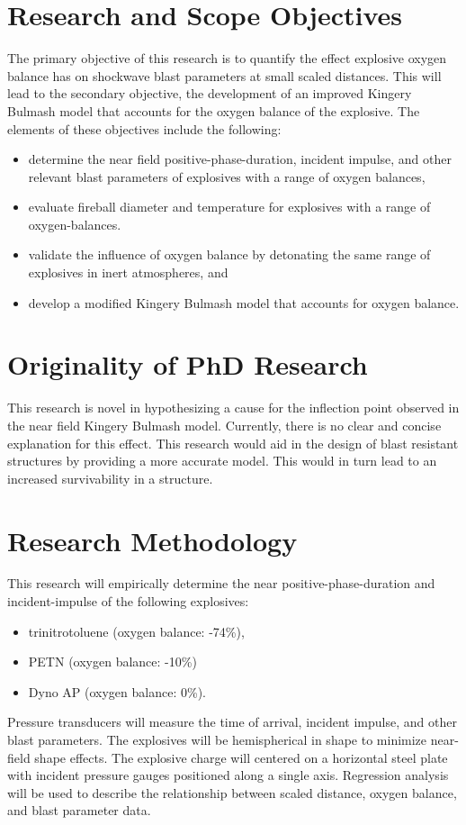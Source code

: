 \section{Research and Scope Objectives}
The primary objective of this research is to quantify the effect explosive oxygen balance has on shockwave blast parameters at small scaled distances. This will lead to the secondary objective, the development of an improved Kingery Bulmash model that accounts for the oxygen balance of the explosive. The elements of these objectives include the following: 
\begin{itemize}
    \item determine the near field positive-phase-duration, incident impulse, and other relevant blast parameters of explosives with a range of oxygen balances,
    \item evaluate fireball diameter and temperature for explosives with a range of oxygen-balances.
    \item validate the influence of oxygen balance by detonating the same range of explosives in inert atmospheres, and
    \item develop a modified Kingery Bulmash model that accounts for oxygen balance.
\end{itemize}
 
\section{Originality of PhD Research}
This research is novel in hypothesizing a cause for the inflection point observed in the near field Kingery Bulmash model. Currently, there is no clear and concise explanation for this effect. This research would aid in the design of blast resistant structures by providing a more accurate model. This would in turn lead to an increased survivability in a structure.
\section{Research Methodology}
This research will empirically determine the near positive-phase-duration and incident-impulse of the following explosives:
\begin{itemize}
    \item trinitrotoluene (oxygen balance: -74\%),
    \item PETN (oxygen balance: -10\%)
    \item Dyno AP (oxygen balance: 0\%).
\end{itemize}
Pressure transducers will measure the time of arrival, incident impulse, and other blast parameters.  The explosives will be hemispherical in shape to minimize near-field shape effects.  The explosive charge will centered on a horizontal steel plate with incident pressure gauges positioned along a single axis.  Regression analysis will be used to describe the relationship between scaled distance, oxygen balance, and blast parameter data.

